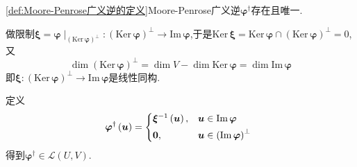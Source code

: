 \begin{formal}
    \begin{theorem}\label{thm:Moore-Penrose广义逆的存在性}
        \cref{def:Moore-Penrose广义逆的定义}\textup{Moore-Penrose}广义逆$\bm{\varphi}^{\dagger}$存在且唯一.
    \end{theorem}
    \begin{Proof}
        做限制$\bm{\xi}=\bm{\varphi}\mid_{\left(\mathrm{Ker}\,\bm{\varphi}\right)^{\perp}}:\left(\mathrm{Ker}\,\bm{\varphi}\right)^{\perp}\longrightarrow\mathrm{Im}\,\bm{\varphi}$,于是$\mathrm{Ker}\,\bm{\xi}=\mathrm{Ker}\,\bm{\varphi}\cap\left(\mathrm{Ker}\,\bm{\varphi}\right)^{\perp}=0$,又\[
        \dim \left(
            \mathrm{Ker}\,\bm{\varphi}
        \right)^{\perp}=\dim V-\dim\mathrm{Ker}\,\bm{\varphi}=\dim\mathrm{Im}\,\bm{\varphi}
                 \]即$\bm{\xi}:\left(
                        \mathrm{Ker}\,\bm{\varphi}
                 \right)^{\perp}\longrightarrow\mathrm{Im}\,\bm{\varphi}$是线性同构.

        定义\[
        \bm{\varphi}^{\dagger}\left(\bm{u}\right)=\begin{cases*}
             \bm{\xi}^{-1}\left(\bm{u}\right),&$\bm{u}\in\mathrm{Im}\,\bm{\varphi}$\\
                \bm{0},&$\bm{u}\in\left(\mathrm{Im}\,\bm{\varphi}\right)^{\perp}$
        \end{cases*}
        \]得到$\bm{\varphi}^{\dagger}\in \mathcal{L}\left(
            U,V
        \right)$.


\end{Proof}
\end{formal}
